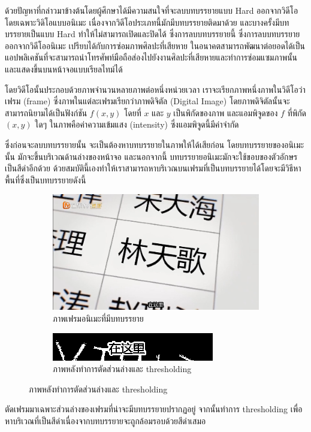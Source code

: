 \documentclass[hidelinks,a4paper,14pt]{article}
\numberwithin{equation}{section}							%
\begin{document}
{	ด้วยปัญหาที่กล่าวมาข้างต้นโดยผู้ศึกษาได้มีความสนใจที่จะลบบทบรรยายแบบ Hard ออกจากวิดีโอ โดยเฉพาะวิดิโอแบบอนิเมะ เนื่องจากวิดีโอประเภทนี้มักมีบทบรรยายติดมาด้วย และบางครั้งมีบทบรรยายเป็นแบบ Hard ทำให้ไม่สามารถเปิดและปิดได้ ซึ่งการลบบทบรรยายนี้ ซึ่งการลบบทบรรยายออกจากวิดีโออนิเมะ เปรียบได้กับการซ่อมภาพศิลปะที่เสียหาย ในอนาคตสามารถพัฒนาต่อยอดได้เป็นแอปพลิเคชันที่จะสามารถนำโทรศัพท์มือถือส่องไปยังงานศิลปะที่เสียหายและทำการซ่อมแซมภาพนั้นและแสดงขึ้นบนหน้าจอแบบเรียลไทม์ได้\newline
	
	โดยวิดีโอนั้นประกอบด้วยภาพจำนวนหลายภาพต่อหนึ่งหน่วยเวลา เราจะเรียกภาพหนึ่งภาพในวิดีโอว่า เฟรม (frame) ซึ่งภาพในแต่ละเฟรมเรียกว่าภาพดิจิตัล (Digital Image) โดยภาพดิจิตัลนั้นจะสามารถนิยามได้เป็นฟังก์ชัน $f(x,y)$ โดยที่ $x$ และ $y$ เป็นพิกัดของภาพ และแอมพิจูดของ $f$ ที่พิกัด $(x,y)$ ใดๆ ในภาพคือค่าความเข้มแสง (intensity)  ซึ่งแอมพิจูดนี้มีค่าจำกัด\newline
	
	ซึ่งก่อนจะลบบทบรรยายนั้น จะเป็นต้องหาบทบรรยายในภาพให้ได้เสียก่อน โดยบทบรรยายของอนิเมะนั้น มักจะขึ้นบริเวณด้านล่างของหน้าจอ และนอกจากนี้ บทบรรยายอนิเมะมักจะใช้ขอบของตัวอักษรเป็นสีดำอีกด้วย ด้วยสมบัตินี้เองทำให้เราสามารถหาบริเวณบนเฟรมที่เป็นบทบรรยายได้โดยจะมีวิธีหาพื้นที่ซึ่งเป็นบทบรรยายดังนี้
	
	\begin{figure}[H]
		\begin{subfigure}{0.4\linewidth}
			\centering
			\includegraphics[width=0.4\linewidth]{images/detection-original.png}
			\caption{ภาพเฟรมอนิเมะที่มีบทบรรยาย}
		\end{subfigure}
		\begin{subfigure}{0.4\linewidth}
			\centering
			\includegraphics[width=0.4\linewidth]{images/detection-threshold.png}
			\caption{ภาพหลังทำการตัดส่วนล่างและ thresholding}
		\end{subfigure}
	\end{figure}
	
ตัดเฟรมมาเฉพาะส่วนล่างของเฟรมที่น่าจะมีบทบรรยายปรากฏอยู่ จากนั้นทำการ thresholding เพื่อหาบริเวณที่เป็นสีดำเนื่องจากบทบรรยายจะถูกล้อมรอบด้วยสีดำเสมอ

}
\end{document}
